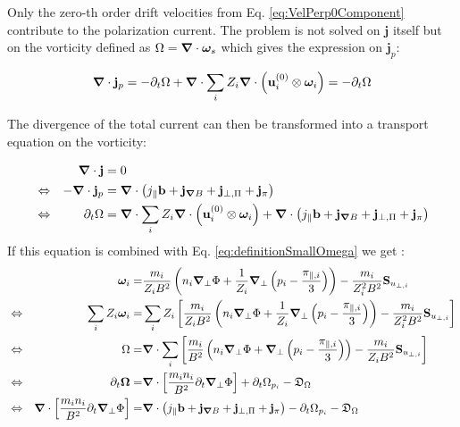  Only the zero-th order drift velocities from Eq. \ref{eq:VelPerp0Component} contribute to the polarization current. The problem is not solved on $\mathbf{j}$ itself but on the vorticity defined as $\Omega = \grad\cdot\boldsymbol{\omega}_s$ which gives the expression on $\mathbf{j}_p$: 
 
 \begin{equation}
 	\grad\cdot\mathbf{j}_p = -\partial_t\Omega + \grad\cdot\sum_{i}Z_i\grad\cdot\left(\mathbf{u}^{(0)}_i\otimes\boldsymbol{\omega}_i\right) = - \partial_t\Omega
 \end{equation}

The divergence of the total current can then be transformed into a transport equation on the vorticity:

 \begin{align}
 	&& \grad\cdot\mathbf{j} &= 0 \nonumber \\
 	&\Leftrightarrow& -\grad\cdot\mathbf{j}_p &= \grad\cdot\left(j_\parallel\mathbf{b} + \mathbf{j}_{\grad B} + \mathbf{j}_{\perp,\Pi} + \mathbf{j}_{\pi} \right) \nonumber \\
 	&\Leftrightarrow& \partial_t\Omega &= \grad\cdot\sum_{i}Z_i\grad\cdot\left(\mathbf{u}^{(0)}_i\otimes\boldsymbol{\omega}_i\right) +\grad\cdot\left(j_\parallel\mathbf{b} + \mathbf{j}_{\grad B} + \mathbf{j}_{\perp,\Pi} + \mathbf{j}_{\pi} \right)
 	\label{eq:TransportEquationVorticity}
 \end{align}
If this equation is combined with Eq. \ref{eq:definitionSmallOmega} we get :
 \begin{align}
 	&& \boldsymbol{\omega}_i =& \frac{m_i}{Z_iB^2}\left(n_i\grad_\perp\Phi + \frac{1}{Z_i}\grad_{\perp}\left(p_i-\frac{\pi_{\parallel,i}}{3}\right)\right) - \frac{m_i}{Z_i^2B^2}\mathbf{S}_{u_{\perp,i}} \nonumber\\
	&\Leftrightarrow& \sum_{i}Z_i\boldsymbol{\omega}_i =& \sum_{i}Z_i\left[\frac{m_i}{Z_i B^2}\left(n_i\grad_\perp\Phi + \frac{1}{Z_i}\grad_{\perp}\left(p_i-\frac{\pi_{\parallel,i}}{3}\right)\right) - \frac{m_i}{Z_i^2B^2}\mathbf{S}_{u_{\perp,i}}\right] \nonumber\\
	&\Leftrightarrow& \Omega =& \grad\cdot\sum_{i}\left[\frac{m_i}{ B^2}\left(n_i\grad_\perp\Phi + \grad_{\perp}\left(p_i-\frac{\pi_{\parallel,i}}{3}\right)\right) - \frac{m_i}{Z_i B^2}\mathbf{S}_{u_{\perp,i}}\right] \nonumber \\
	&\Leftrightarrow& \partial_t\mathbf{\Omega} =& \grad\cdot\left[\frac{m_i n_i}{ B^2}\partial_t\grad_\perp\Phi\right] + \partial_t \Omega_{p_i} - \mathfrak{D}_\Omega \nonumber \\
	&\Leftrightarrow& \grad\cdot\left[\frac{m_i n_i}{ B^2}\partial_t\grad_\perp\Phi\right]  =&  \grad\cdot\left(j_\parallel\mathbf{b} + \mathbf{j}_{\grad B} + \mathbf{j}_{\perp,\Pi} + \mathbf{j}_{\pi}\right) - \partial_t \Omega_{p_i} - \mathfrak{D}_\Omega \label{eq:FirstFormVorticityEquation}
 \end{align}
 
